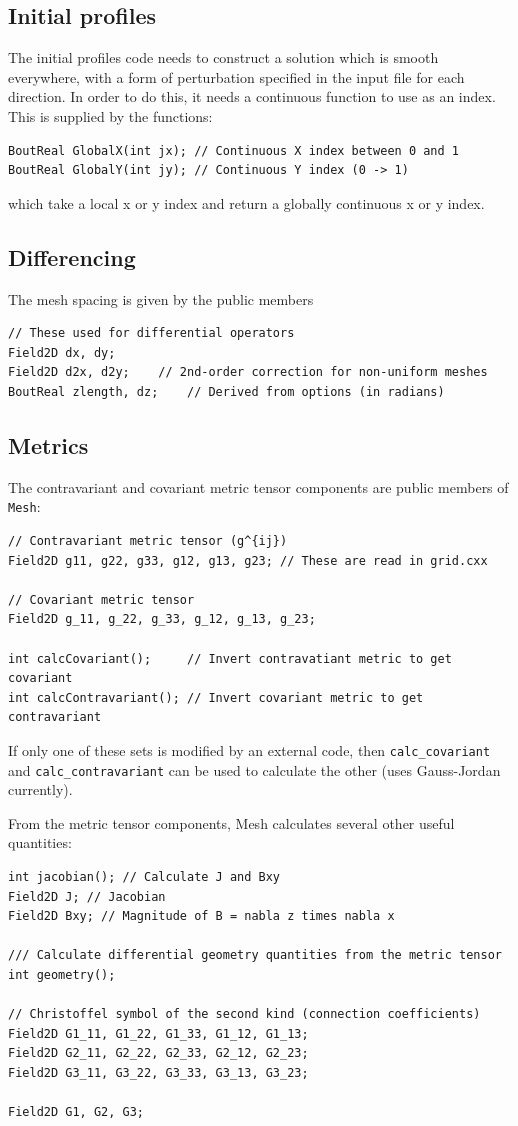 \documentclass[12pt]{article}
\newcommand{\code}[1]{\texttt{#1}}
\begin{document}
\subsection{Initial profiles}
The initial profiles code needs to construct a solution which is smooth
everywhere, with a form of perturbation specified in the input file
for each direction. In order to do this, it needs a continuous function
to use as an index. This is supplied by the functions:
\begin{lstlisting}
BoutReal GlobalX(int jx); // Continuous X index between 0 and 1
BoutReal GlobalY(int jy); // Continuous Y index (0 -> 1)
\end{lstlisting}
which take a local x or y index and return a globally continuous x or y
index.

\subsection{Differencing}

The mesh spacing is given by the public members
\begin{lstlisting}
// These used for differential operators 
Field2D dx, dy;
Field2D d2x, d2y;    // 2nd-order correction for non-uniform meshes		
BoutReal zlength, dz;    // Derived from options (in radians)
\end{lstlisting}

\subsection{Metrics}
The contravariant and covariant metric tensor components are
public members of \code{Mesh}: 
\begin{lstlisting}
// Contravariant metric tensor (g^{ij})
Field2D g11, g22, g33, g12, g13, g23; // These are read in grid.cxx

// Covariant metric tensor
Field2D g_11, g_22, g_33, g_12, g_13, g_23;

int calcCovariant();     // Invert contravatiant metric to get covariant
int calcContravariant(); // Invert covariant metric to get contravariant
\end{lstlisting}
If only one of these sets is modified by an external code, then
\code{calc\_covariant} and \code{calc\_contravariant} can be used
to calculate the other (uses Gauss-Jordan currently).

From the metric tensor components, Mesh calculates several other useful
quantities:
\begin{lstlisting}
int jacobian(); // Calculate J and Bxy
Field2D J; // Jacobian
Field2D Bxy; // Magnitude of B = nabla z times nabla x

/// Calculate differential geometry quantities from the metric tensor
int geometry();

// Christoffel symbol of the second kind (connection coefficients)
Field2D G1_11, G1_22, G1_33, G1_12, G1_13;
Field2D G2_11, G2_22, G2_33, G2_12, G2_23;
Field2D G3_11, G3_22, G3_33, G3_13, G3_23;
  
Field2D G1, G2, G3;
\end{lstlisting}
\end{document}
